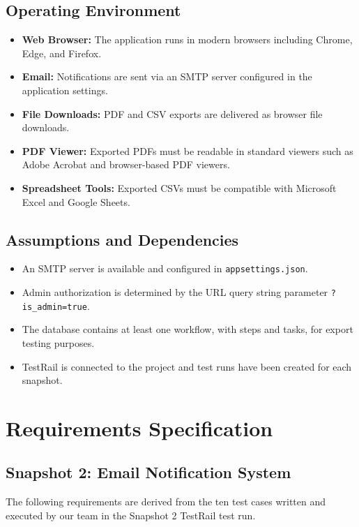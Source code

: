 \documentclass[12pt]{article}
\begin{document}
\subsection{Operating Environment}
\begin{itemize}
    \item \textbf{Web Browser:} The application runs in modern browsers including Chrome,
    Edge, and Firefox.
    \item \textbf{Email:} Notifications are sent via an SMTP server configured in the
    application settings.
    \item \textbf{File Downloads:} PDF and CSV exports are delivered as browser file
    downloads.
    \item \textbf{PDF Viewer:} Exported PDFs must be readable in standard viewers such as
    Adobe Acrobat and browser-based PDF viewers.
    \item \textbf{Spreadsheet Tools:} Exported CSVs must be compatible with Microsoft Excel
    and Google Sheets.
\end{itemize}
 
\subsection{Assumptions and Dependencies}
\begin{itemize}
    \item An SMTP server is available and configured in \texttt{appsettings.json}.
    \item Admin authorization is determined by the URL query string parameter
    \texttt{?is\_admin=true}.
    \item The database contains at least one workflow, with steps and tasks, for export
    testing purposes.
    \item TestRail is connected to the project and test runs have been created for each
    snapshot.
\end{itemize}
 
\section{Requirements Specification}
 
\subsection{Snapshot 2: Email Notification System}
The following requirements are derived from the ten test cases written and executed by our
team in the Snapshot 2 TestRail test run.
 
\end{document}
